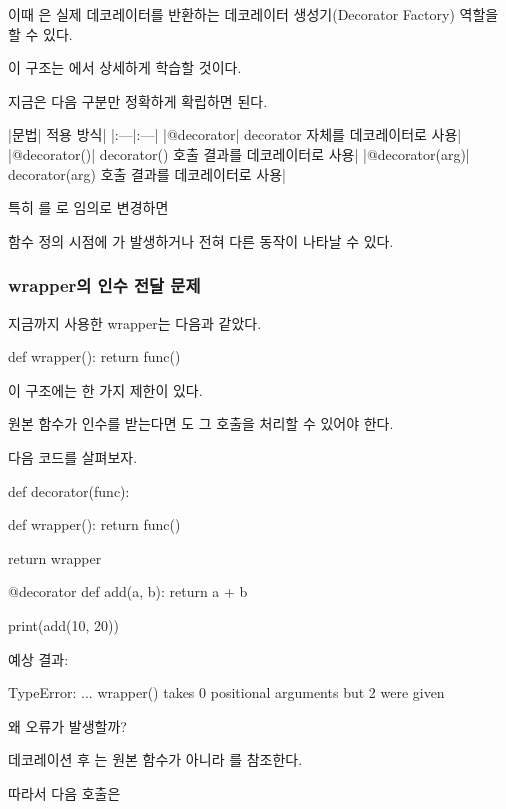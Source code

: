 이때 은 실제 데코레이터를 반환하는 데코레이터 생성기(Decorator Factory) 역할을 할 수 있다.

이 구조는 에서 상세하게 학습할 것이다.

지금은 다음 구분만 정확하게 확립하면 된다.

\begin{dhktable}
|문법|	적용 방식|
|:---|:---|
|@decorator|	decorator 자체를 데코레이터로 사용|
|@decorator()|	decorator() 호출 결과를 데코레이터로 사용|
|@decorator(arg)|	decorator(arg) 호출 결과를 데코레이터로 사용|
\end{dhktable}

특히 를 로 임의로 변경하면

함수 정의 시점에 가 발생하거나 전혀 다른 동작이 나타날 수 있다.

\subsubsection{wrapper의 인수 전달 문제}

지금까지 사용한 wrapper는 다음과 같았다.

\begin{dhkcode}
def wrapper():
    return func()
\end{dhkcode}

이 구조에는 한 가지 제한이 있다.

원본 함수가 인수를 받는다면 도 그 호출을 처리할 수 있어야 한다.

다음 코드를 살펴보자.

\begin{dhkcode}
def decorator(func):

    def wrapper():
        return func()

    return wrapper


@decorator
def add(a, b):
    return a + b


print(add(10, 20))
\end{dhkcode}

예상 결과:

\begin{dhkzsh}
TypeError: ... wrapper() takes 0 positional arguments 
but 2 were given
\end{dhkzsh}

왜 오류가 발생할까?

데코레이션 후 는 원본 함수가 아니라 를 참조한다.

따라서 다음 호출은


